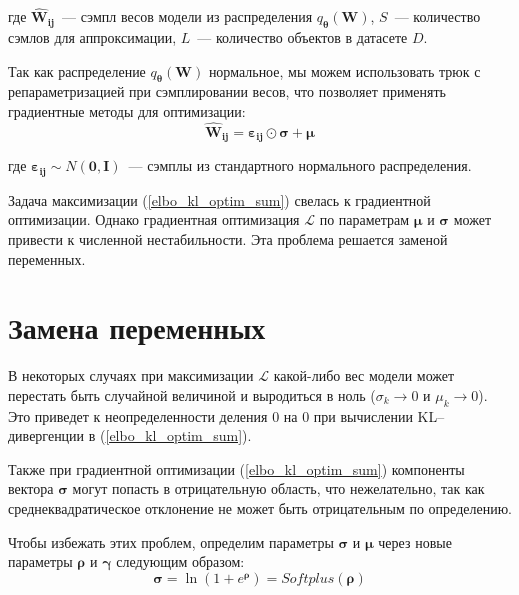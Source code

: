 \documentclass{article}
\numberwithin{equation}{section}
\begin{document}
    где $\pmb{\hat{W}_{ij}}$~--- сэмпл весов модели из распределения
    $q_{\pmb{\theta}}(\pmb{W})$,
    $S$~--- количество сэмлов для аппроксимации,
    $L$~--- количество объектов в датасете $D$.

    Так как распределение $q_{\pmb{\theta}}(\pmb{W})$ нормальное,
    мы можем использовать трюк с репараметризацией при сэмплировании весов,
    что позволяет применять градиентные методы для оптимизации:
    \begin{equation}\label{w_trick}
        \pmb{\hat{W}_{ij}}
        =
            \pmb{\varepsilon_{ij}}
            \odot
            \pmb{\sigma}
            +
            \pmb{\mu}
    \end{equation}

    где $\pmb{\varepsilon_{ij}} \sim N(\pmb{0}, \pmb{I})$~--- сэмплы из стандартного
    нормального распределения.

    Задача максимизации (\ref{elbo_kl_optim_sum})
    свелась к градиентной оптимизации.
    Однако градиентная оптимизация $\mathcal{L}$ по параметрам $\pmb{\mu}$ и $\pmb{\sigma}$ может привести
    к численной нестабильности. Эта проблема решается заменой переменных.

    \section{Замена переменных}

    В некоторых случаях при максимизации $\mathcal{L}$
    какой-либо вес модели может перестать быть случайной величиной
    и выродиться в ноль
    ($\sigma_{k} \rightarrow 0$ и $\mu_{k} \rightarrow 0$).
    Это приведет к неопределенности деления 0 на 0
    при вычислении KL--дивергенции в (\ref{elbo_kl_optim_sum}).

    Также при градиентной оптимизации (\ref{elbo_kl_optim_sum})
    компоненты вектора $\pmb{\sigma}$ могут попасть в отрицательную область,
    что нежелательно, так как среднеквадратическое отклонение
    не может быть отрицательным по определению.

    Чтобы избежать этих проблем,
    определим параметры $\pmb{\sigma}$ и $\pmb{\mu}$
    через новые параметры $\pmb{\rho}$ и $\pmb{\gamma}$
    следующим образом:
    \begin{equation}\label{sigma_def}
        \pmb{\sigma}
        =
            \ln({
                1 + e^{\pmb{\rho}}
            })
        =
            Softplus (\pmb{\rho})
    \end{equation}
\end{document}
